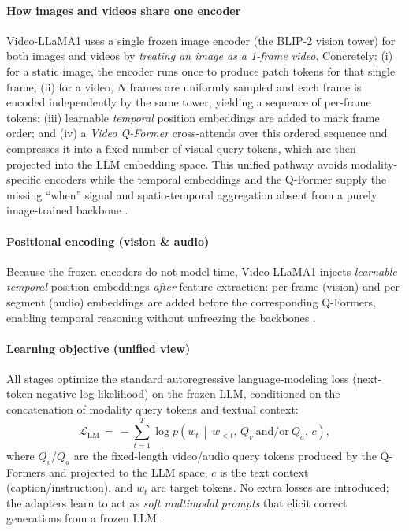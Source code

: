 \begin{enrichment}
\begin{enrichment}
        \paragraph{How images and videos share one encoder}
        Video\mbox{-}LLaMA1 uses a single frozen image encoder (the BLIP\mbox{-}2 vision tower) for both images and videos by \emph{treating an image as a 1\mbox{-}frame video}. Concretely: (i) for a static image, the encoder runs once to produce patch tokens for that single frame; (ii) for a video, $N$ frames are uniformly sampled and each frame is encoded independently by the same tower, yielding a sequence of per\mbox{-}frame tokens; (iii) learnable \emph{temporal} position embeddings are added to mark frame order; and (iv) a \emph{Video Q\mbox{-}Former} cross\mbox{-}attends over this ordered sequence and compresses it into a fixed number of visual query tokens, which are then projected into the LLM embedding space. This unified pathway avoids modality\mbox{-}specific encoders while the temporal embeddings and the Q\mbox{-}Former supply the missing “when” signal and spatio\mbox{-}temporal aggregation absent from a purely image\mbox{-}trained backbone \cite[Sec.~2.1.1--2.2]{zhang2023_videollama}.
        
        \paragraph{Positional encoding (vision \& audio)}
        Because the frozen encoders do not model time, Video\mbox{-}LLaMA1 injects \emph{learnable temporal} position embeddings \emph{after} feature extraction: per\mbox{-}frame (vision) and per\mbox{-}segment (audio) embeddings are added before the corresponding Q\mbox{-}Formers, enabling temporal reasoning without unfreezing the backbones \cite[Sec.~2.1.1--2.1.2]{zhang2023_videollama}.
        
        \paragraph{Learning objective (unified view)}
        All stages optimize the standard autoregressive language\mbox{-}modeling loss (next\mbox{-}token negative log\mbox{-}likelihood) on the frozen LLM, conditioned on the concatenation of modality query tokens and textual context:
        \[
        \mathcal{L}_{\mathrm{LM}}
        \,=\,
        -\sum_{t=1}^{T}
        \log p\!\left(
        w_t \,\middle|\,
        w_{<t},\,
        Q_v \ \text{and/or}\ Q_a,\,
        c
        \right),
        \]
        where $Q_v$/$Q_a$ are the fixed\mbox{-}length video/audio query tokens produced by the Q\mbox{-}Formers and projected to the LLM space, $c$ is the text context (caption/instruction), and $w_t$ are target tokens. No extra losses are introduced; the adapters learn to act as \emph{soft multimodal prompts} that elicit correct generations from a frozen LLM \cite[Sec.~2.2]{zhang2023_videollama}.
        

\end{enrichment}
\end{enrichment}
